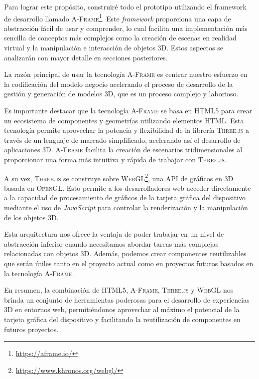 \documentclass[a4paper, 11pt]{book}
\begin{document}
Para lograr este propósito, construiré todo el prototipo utilizando el \Gls{framework} de desarrollo llamado \textsc{A-Frame}\footnote{\url{https://aframe.io/}}. Este \emph{framework} proporciona una capa de abstracción fácil de usar y comprender, lo cual facilita una implementación más sencilla de conceptos más complejos como la creación de escenas en realidad virtual y la manipulación e interacción de objetos \textsc{3D}. 
Estos aspectos se analizarán con mayor detalle en secciones posteriores.

La razón principal de usar la tecnología \textsc{A-Frame} es centrar nuestro esfuerzo en la codificación del modelo negocio acelerando el proceso de desarrollo de la gestión y generación de modelos \textsc{3D}, que es un proceso complejo y laborioso.

Es importante destacar que la tecnología \textsc{A-Frame} se basa en \textsc{HTML5} para crear un ecosistema de componentes y geometrías utilizando elementos \textsc{HTML}. Esta tecnología permite aprovechar la potencia y flexibilidad de la librería \textsc{Three.js} a través de un lenguaje de marcado simplificado, acelerando así el desarrollo de aplicaciones \textsc{3D}. \textsc{A-Frame} facilita la creación de escenarios tridimensionales al proporcionar una forma más intuitiva y rápida de trabajar con \textsc{Three.js}.

A su vez, \textsc{Three.js} se construye sobre \textsc{\gls{WebGL}}\footnote{\url{https://www.khronos.org/webgl/}}, una \Gls{API} de gráficos en \textsc{3D} basada en \textsc{OpenGL}. Esto permite a los desarrolladores web acceder directamente a la capacidad de procesamiento de gráficos de la tarjeta gráfica del dispositivo mediante el uso de \emph{JavaScript} para controlar la \gls{renderización} y la manipulación de los objetos \textsc{3D}.

Esta arquitectura nos ofrece la ventaja de poder trabajar en un nivel de abstracción inferior cuando necesitamos abordar tareas más complejas relacionadas con objetos \textsc{3D}. Además, podemos crear componentes reutilizables que serán útiles tanto en el proyecto actual como en proyectos futuros basados en la tecnología \textsc{A-Frame}.

En resumen, la combinación de \textsc{HTML5}, \textsc{A-Frame}, \textsc{Three.js} y \textsc{WebGL} nos brinda un conjunto de herramientas poderosas para el desarrollo de experiencias \textsc{3D} en entornos web, permitiéndonos aprovechar al máximo el potencial de la tarjeta gráfica del dispositivo y facilitando la reutilización de componentes en futuros proyectos.
\end{document}
